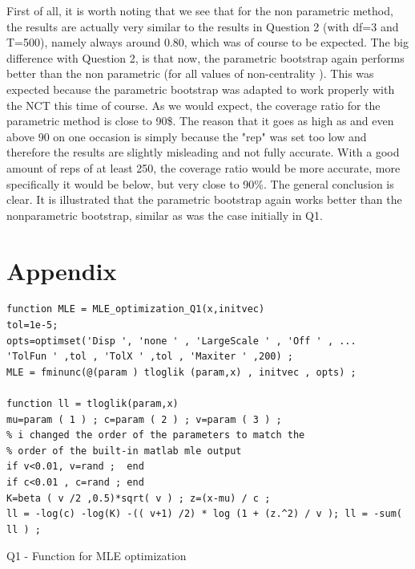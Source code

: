 \documentclass[12pt]{article}
\begin{document}
\vspace{10mm}
First of all, it is worth noting that we see that for the non parametric method, the results are actually very similar to the results in Question 2 (with df=3 and T=500), namely always around 0.80, which was of course to be expected. \newline \newline The big difference with Question 2, is that now, the parametric bootstrap again performs better than the non parametric (for all values of non-centrality ). This was expected because the parametric bootstrap was adapted to work properly with the NCT this time of course. As we would expect, the coverage ratio for the parametric method is close to 90\$. The reason that it goes as high as and even above 90 on one occasion is simply because the "rep" was set too low and therefore the results are slightly misleading and not fully accurate. With a good amount of reps of at least 250, the coverage ratio would be more accurate, more specifically it would be below, but very close to 90\%.
\newline \newline The general conclusion is clear. It is illustrated that the parametric bootstrap again works  better than the nonparametric bootstrap, similar as was the case initially in Q1. \newline

\newpage
\section{Appendix}

\begin{Program}[!htb]
\begin{lstlisting}[style=Matlab-editor,basicstyle=\mlttfamily\footnotesize]
%Q1 - Function for MLE optimization ---------------------------------------
function MLE = MLE_optimization_Q1(x,initvec)
tol=1e-5;
opts=optimset('Disp ', 'none ' , 'LargeScale ' , 'Off ' , ...
'TolFun ' ,tol , 'TolX ' ,tol , 'Maxiter ' ,200) ;
MLE = fminunc(@(param ) tloglik (param,x) , initvec , opts) ;

function ll = tloglik(param,x)
mu=param ( 1 ) ; c=param ( 2 ) ; v=param ( 3 ) ; 
% i changed the order of the parameters to match the 
% order of the built-in matlab mle output
if v<0.01, v=rand ;  end 
if c<0.01 , c=rand ; end 
K=beta ( v /2 ,0.5)*sqrt( v ) ; z=(x-mu) / c ;
ll = -log(c) -log(K) -(( v+1) /2) * log (1 + (z.^2) / v ); ll = -sum( ll ) ;
\end{lstlisting}
\caption{Q1 - Function for MLE optimization}
\label{Q1 - Function for MLE optimization}
\end{Program}
\end{document}
